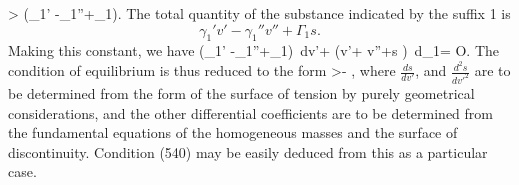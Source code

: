 \documentclass[12pt]{article}
\begin{document}
{\eqs \sigma {}> \left(\gamma_1' -\gamma_1''+\Gamma_1\right). \label{545}\eqe
The total quantity of the substance indicated by the suffix 1 is
$$\gamma_1' v'-\gamma_1''v''+\Gamma_1 s.$$
Making this constant, we have
\eqs
\left(\gamma_1' -\gamma_1''+\Gamma_1\right)\, dv'+ 
\left(v'+ v''+s \right)\, d\mu_1= O. \label{546}\eqe
The condition of equilibrium is thus reduced to the form
\eqs \sigma {}>- ,\label{547}\eqe
where $\frac{ds}{dv'}$, and $\frac{d^2s}{dv'^2}$ are to be determined from the form of the surface of tension by purely geometrical considerations, and the other differential coefficients are to be determined from the fundamental equations of the homogeneous masses and the surface of discontinuity. Condition (540) may be easily deduced from this as a particular case.

}
\end{document}
